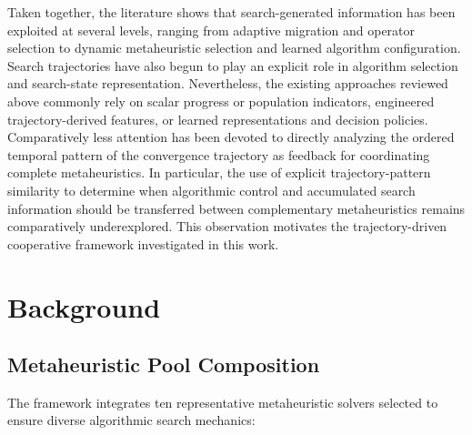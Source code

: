 \documentclass[review]{elsarticle}
\begin{document}
Taken together, the literature shows that search-generated information has
been exploited at several levels, ranging from adaptive migration and
operator selection to dynamic metaheuristic selection and learned algorithm
configuration. Search trajectories have also begun to play an explicit role
in algorithm selection and search-state representation. Nevertheless, the
existing approaches reviewed above commonly rely on scalar progress or
population indicators, engineered trajectory-derived features, or learned
representations and decision policies. Comparatively less attention has
been devoted to directly analyzing the ordered temporal pattern of the
convergence trajectory as feedback for coordinating complete
metaheuristics. In particular, the use of explicit trajectory-pattern
similarity to determine when algorithmic control and accumulated search
information should be transferred between complementary metaheuristics
remains comparatively underexplored. This observation motivates the
trajectory-driven cooperative framework investigated in this work.

\section{Background}
\label{sec:background}

\subsection{Metaheuristic Pool Composition}
\label{sec:metaheuristic_pools}

The framework integrates ten representative metaheuristic solvers selected to ensure diverse algorithmic search mechanics:
\end{document}
